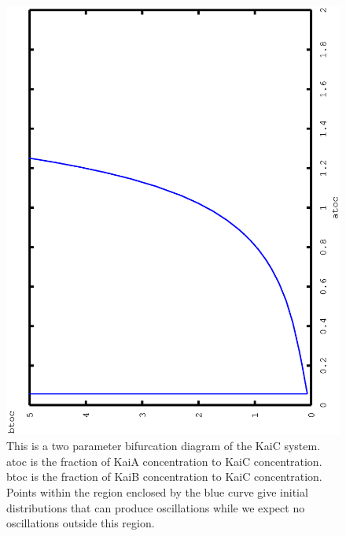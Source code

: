 \documentclass[a4paper,10pt]{article}
\numberwithin{equation}{section}
\begin{document}
\begin{figure}[H]
\centering
\includegraphics[scale=0.45]{model18twopar.ps}
\caption{ \selectfont This is a two parameter bifurcation diagram of the KaiC system. atoc is the fraction of KaiA concentration to KaiC concentration. btoc is the fraction of KaiB concentration to KaiC concentration. Points within the region enclosed by the blue curve give initial distributions that can produce oscillations while we expect no oscillations outside this region. }\label{fig:model18twopar}
\end{figure}
\end{document}
